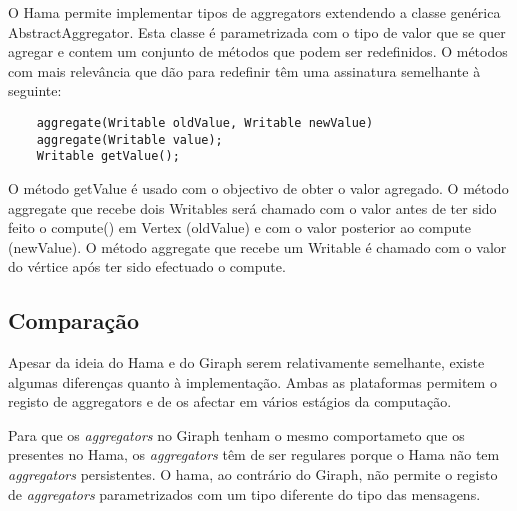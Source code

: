     O Hama permite implementar tipos de aggregators extendendo a classe genérica AbstractAggregator.
    Esta classe é parametrizada com o tipo de valor que se quer agregar e contem um conjunto de métodos que podem ser redefinidos.
    O métodos com mais relevância que dão para redefinir têm uma assinatura semelhante à seguinte:
    \begin{lstlisting}
    aggregate(Writable oldValue, Writable newValue)			  
    aggregate(Writable value);
    Writable getValue();
    \end{lstlisting}
    O método getValue é usado com o objectivo de obter o valor agregado. 
    O método aggregate que recebe dois Writables será chamado com o valor antes de ter sido feito o compute() em Vertex (oldValue) e com
    o valor posterior ao compute (newValue). O método aggregate que recebe um Writable é chamado com o valor do vértice após ter sido efectuado
    o compute. 

  \subsection*{Comparação}
  
  Apesar da ideia do Hama e do Giraph serem relativamente semelhante, existe algumas diferenças quanto à implementação. Ambas as plataformas
  permitem o registo de aggregators e de os afectar em vários estágios da computação. 
  
  Para que os \textit{aggregators} no Giraph tenham o mesmo comportameto que os presentes no Hama, os \textit{aggregators} têm de ser regulares porque o Hama não tem \textit{aggregators} persistentes. O hama, ao contrário do Giraph, não permite o registo de \textit{aggregators} parametrizados com um tipo diferente do tipo das mensagens.
  

